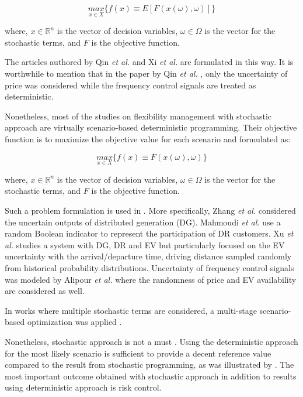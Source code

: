 \begin{equation*}
	\underset{x\in X}{max}\{ f(x) \equiv E[F(x(\omega),\omega) ] \}
\end{equation*}
 
where, $x \in \mathbb{R}^n$ is the vector of decision variables, $\omega \in  \Omega$ is the vector for the stochastic terms, and $F$ is the objective function. 

The articles authored by Qin \textit{et al.} \cite{Qin2012} and Xi \textit{et al.} \cite{Xi2014} are formulated in this way. It is worthwhile to mention that in the paper by Qin \textit{et al.} \cite{Qin2012}, only the uncertainty of price was considered while the frequency control signals are treated as deterministic. 

Nonetheless, most of the studies on flexibility management with stochastic approach are virtually scenario-based deterministic programming. Their objective function is to maximize the objective value for each scenario and formulated as:

\begin{equation*}
\underset{x\in X}{max}\{ f(x) \equiv F(x(\omega),\omega)\}
\end{equation*}

where, $x \in \mathbb{R}^n$ is the vector of decision variables, $\omega \in  \Omega$ is the vector for the stochastic terms, and $F$ is the objective function. 

Such a problem formulation is used in \cite{Zhang2016,Alipour2017,Mahmoudi2017,Xu2017,Han2017,Calvillo2016,Mahmoudi2014}. More specifically, Zhang \textit{et al.} \cite{Zhang2016} considered the uncertain outputs of distributed generation (DG). Mahmoudi \textit{et al.} \cite{Mahmoudi2017} use a random Boolean indicator to represent the participation of DR customers. Xu \textit{et al.} \cite{Xu2017} studies a system with DG, DR and EV but particularly focused on the EV uncertainty with the arrival/departure time, driving distance sampled randomly from historical probability distributions. Uncertainty of frequency control signals was modeled by Alipour \textit{et al.} \cite{Alipour2017} where the randomness of price and EV availability are considered as well. 

In works where multiple stochastic terms are considered, a multi-stage scenario-based optimization was applied \cite{Alipour2017,Han2017}.

Nonetheless, stochastic approach is not a must \cite{Zucker2013}. Using the deterministic approach for the most likely scenario is sufficient to provide a decent reference value compared to the result from stochastic programming, as was illustrated by \cite{Calvillo2016}. The most important outcome obtained with stochastic approach in addition to results using deterministic approach is risk control. 

